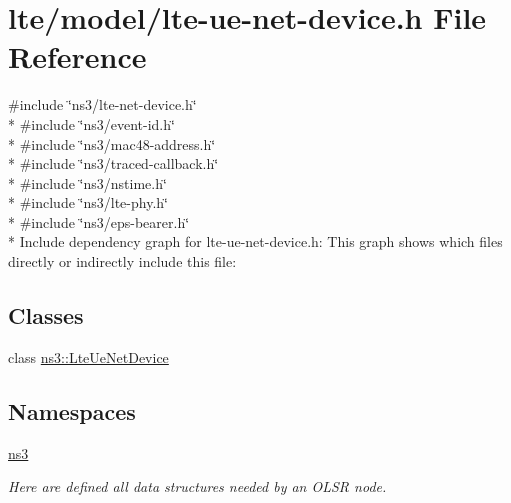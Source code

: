 \hypertarget{lte-ue-net-device_8h}{}\section{lte/model/lte-\/ue-\/net-\/device.h File Reference}
\label{lte-ue-net-device_8h}
{\ttfamily \#include \char`\"{}ns3/lte-\/net-\/device.\+h\char`\"{}}\\*
{\ttfamily \#include \char`\"{}ns3/event-\/id.\+h\char`\"{}}\\*
{\ttfamily \#include \char`\"{}ns3/mac48-\/address.\+h\char`\"{}}\\*
{\ttfamily \#include \char`\"{}ns3/traced-\/callback.\+h\char`\"{}}\\*
{\ttfamily \#include \char`\"{}ns3/nstime.\+h\char`\"{}}\\*
{\ttfamily \#include \char`\"{}ns3/lte-\/phy.\+h\char`\"{}}\\*
{\ttfamily \#include \char`\"{}ns3/eps-\/bearer.\+h\char`\"{}}\\*
Include dependency graph for lte-\/ue-\/net-\/device.h\+:
This graph shows which files directly or indirectly include this file\+:
\subsection*{Classes}
\begin{DoxyCompactItemize}
\item 
class \hyperlink{classns3_1_1LteUeNetDevice}{ns3\+::\+Lte\+Ue\+Net\+Device}
\end{DoxyCompactItemize}
\subsection*{Namespaces}
\begin{DoxyCompactItemize}
\item 
 \hyperlink{namespacens3}{ns3}
\begin{DoxyCompactList}\small\item\em Here are defined all data structures needed by an O\+L\+SR node. \end{DoxyCompactList}\end{DoxyCompactItemize}
